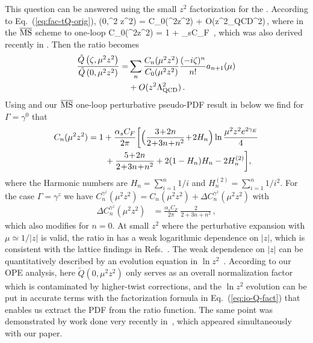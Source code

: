 This question can be answered using the small $z^2$ factorization for the \spcorr.
 According to Eq.~(\ref{eq:fac-tQ-orig}),
\beq
	(0,\mu^2 z^2) = C_0(\mu^2z^2) + O(z^2\Lambda_{\rm QCD}^2)\,,
\eeq
where in the $\overline{\rm MS}$ scheme to one-loop
\beq  \label{eq:C0}
	C_0(\mu^2z^2) = 1 + {\alpha_sC_F\pi}  \,,
\eeq
which was also derived recently in \cite{Zhang:2018ggy}.
Then the ratio becomes
\begin{align} \label{eq:Qtratio}
	\frac{\tilde{Q}\left(\zeta, {\mu}^2 z^2\right)}{\tilde{Q}\left(0, {\mu}^2 z^2\right)}
	=&\sum_n \frac{C_n (\mu^2z^2)}{C_0 (\mu^2z^2)}	\frac{(-i \zeta)^n}{n!} a_{n+1}(\mu)\\
	&+ O(z^2\Lambda_{\rm QCD}^2)\,.\nonumber
\end{align}
Using  and our $\overline{\rm MS}$ one-loop perturbative pseudo-PDF result in  below we find for $\Gamma=\gamma^0$ that
\begin{align}
  C_n(\mu^2 z^2) &= 1 +\frac{\alpha_s C_F}{2\pi} \biggl[ \Bigl(
  \frac{3\!+\!2n}{2\!+\!3n\!+\!n^2}
  \!+\! 2H_n\Bigr) \ln\frac{\mu^2z^2 e^{2\gamma_E}}{4}
  \nn\\
 &\quad\quad
  +   \frac{5\!+\!2n}{2\!+\!3n\!+\!n^2}+2(1-H_n)H_n - 2 H_n^{(2)}
  \biggr] ,
\end{align}
where the Harmonic numbers are $H_n=\sum_{i=1}^n 1/i$ and $H_n^{(2)} =\sum_{i=1}^n 1/i^2$.  For the case $\Gamma=\gamma^z$ we have $C_n^{\gamma^z}(\mu^2 z^2) = C_n(\mu^2 z^2) + \Delta C_n^{\gamma^z}(\mu^2 z^2)$ with
\begin{align}
  \Delta C_n^{\gamma^z}(\mu^2 z^2)
   &= \frac{\alpha_s C_F}{2\pi} \: \frac{2}{2\!+\!3n\!+\!n^2} \,,
\end{align}
which also modifies  for $n=0$.
At small $z^2$ where the perturbative expansion with $\mu\simeq 1/|z|$ is valid, the ratio in  has a weak logarithmic dependence on $|z|$, which is consistent with the lattice findings in Refs.~\cite{Orginos:2017kos,Karpie:2017bzm}. The weak dependence on $|z|$ can be quantitatively described by an evolution equation in $\ln z^2$~\cite{Radyushkin:2017cyf,Radyushkin:2017lvu}. According to our OPE analysis, here $\tilde{Q}(0,\mu^2 z^2)$ only serves as an overall normalization factor which is contaminated by higher-twist corrections, and the $\ln z^2$ evolution can be put in accurate terms with the factorization formula in Eq.~(\ref{eq:io-Q-fact}) that enables us extract the PDF from the ratio function. The same point was demonstrated by work done very recently in~\cite{Zhang:2018ggy}, which appeared simultaneously with our paper.
